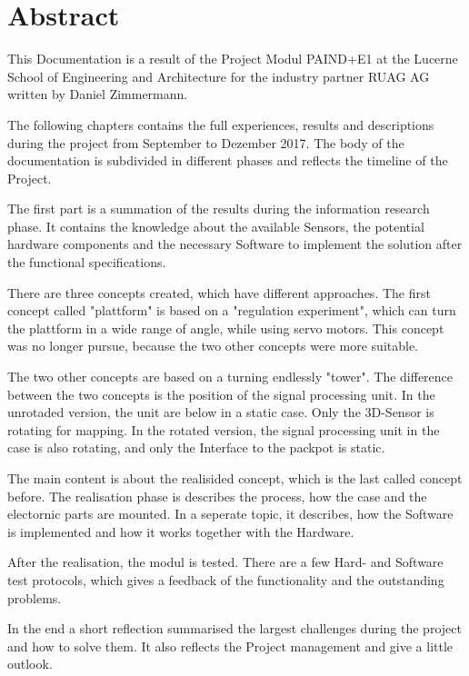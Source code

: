 \chapter*{Abstract}
\label{chap:Abstract}
This Documentation is a result of the Project Modul PAIND+E1 at the Lucerne School of Engineering and Architecture for the industry partner RUAG AG written by Daniel Zimmermann. 

The following chapters contains the full experiences, results and descriptions during the project from September to Dezember 2017. The body of the documentation is subdivided in different phases and reflects the timeline of the Project. 

The first part is a summation of the results during the information research phase. It contains the knowledge about the available Sensors, the potential hardware components and the necessary Software to implement the solution after the functional specifications.  

There are three concepts created, which have different approaches. The first concept called "plattform" is based on a "regulation experiment", which can turn the plattform in a wide range of angle, while using servo motors. This concept was no longer pursue, because the two other concepts were more suitable.

The two other concepts are based on a turning endlessly "tower". The difference between the two concepts is the position of the signal processing unit. In the unrotaded version, the unit are below in a static case. Only the 3D-Sensor is rotating for mapping. In the rotated version, the signal processing unit in the case is also rotating, and only the Interface to the packpot is static. 

The main content is about the realisided concept, which is the last called concept before. The realisation phase is describes the process, how the case and the electornic parts are mounted. In a seperate topic, it describes, how the Software is implemented and how it works together with the Hardware. 

After the realisation, the modul is tested. There are a few Hard- and Software test protocols, which gives a feedback of the functionality and the outstanding problems.

In the end a short reflection summarised the largest challenges during the project and how to solve them. It also reflects the Project management and give a little outlook.



